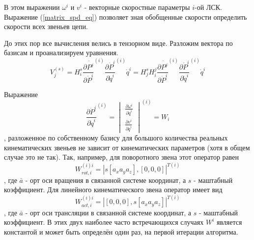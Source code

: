 В этом выражении $\omega^i$ и $v^i$ - векторные скоростные параметры $i$-ой ЛСК. Выражение (\ref{matrix_spd_eq}) позволяет зная обобщенные скорости определить скорости всех звеньев цепи. 

До этих пор все вычисления велись в тензорном виде. Разложим вектора по базисам и проанализируем уравнения.
\begin{equation}\label{basis_eq}
V^{(s)}_j = H^s_i\frac{\partial{\dot{P^j}}}{\partial{\dot{P}^i}}^{(i)}\frac{\partial{\dot{P}^i}}{\partial{\dot{q}^i}}^{(i)}\dot{q}^i=H^s_jH^j_i\frac{\partial{\dot{P^j}}}{\partial{\dot{P}^i}}^{(i)}\frac{\partial{\dot{P}^i}}{\partial{\dot{q}^i}}^{(i)}\dot{q}^i
\end{equation}

Выражение 
\begin{equation}\label{}
\frac{\partial{\dot{P}^i}}{\partial{\dot{q}^i}}^{(i)}
=
\begin{vmatrix}
\frac{\partial{\omega^i}}{\partial{\dot{q}^i}}\\
\frac{\partial{v^i}}{\partial{\dot{q}^i}}
\end{vmatrix}^{(i)}=W_i
\end{equation},
разложенное по собственному базису для большого количества реальных кинематических звеньев не зависит от кинематических параметров (хотя в общем случае это не так). Так, например, для поворотного звена этот оператор равен 
\begin{equation}\label{}
W_{rot,i}^{(i)i} = |s[a_x a_y a_z], [0, 0, 0]|^{T(i)}
\end{equation}, где $\bar{a}$ - орт оси вращения в связанной системе координат, а $s$ - маштабный коэффициент. Для линейного кинематического звена оператор имеет вид 
\begin{equation}\label{}
W_{act,i}^{(i)i} = |[0, 0, 0], s[a_x a_y a_z]|^{T(i)}
\end{equation}, где $\bar{a}$ - орт оси трансляции в связанной системе координат, а $s$ - маштабный коэффициент. 
В этих двух наиболее часто встречающихся случаях $W^i$ является константой и может быть определён один раз, на первой итерации алгоритма.

